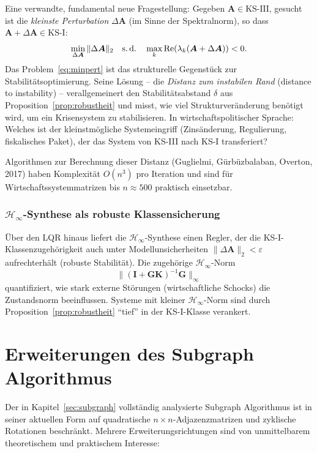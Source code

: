 ﻿\documentclass[12pt, a4paper, titlepage]{report}
\theoremstyle{definition}
\theoremstyle{remark}
\newcommand{\vA}{\bm{A}}
\newcommand{\vI}{\bm{I}}
\newcommand{\vK}{\bm{K}}
\newcommand{\vG}{\bm{G}}
\newcommand{\re}{\mathrm{Re}}
\newcommand{\KS}{\mathrm{KS}}
\begin{document}
Eine verwandte, fundamental neue Fragestellung: Gegeben $\vA \in \KS\text{-III}$,
gesucht ist die \emph{kleinste Perturbation} $\Delta\vA$ (im Sinne der Spektralnorm),
so dass $\vA + \Delta\vA \in \KS\text{-I}$:
\begin{equation}
  \min_{\Delta\vA} \|\Delta\vA\|_2 \quad \text{s.\,d.} \quad
  \max_k \re(\lambda_k(\vA + \Delta\vA)) < 0.
  \label{eq:minpert}
\end{equation}
Das Problem~\eqref{eq:minpert} ist das strukturelle Gegenstück zur
Stabilitätsoptimierung. Seine Lösung -- die \emph{Distanz zum instabilen Rand} (distance
to instability) -- verallgemeinert den Stabilitätsabstand $\delta$ aus
Proposition~\ref{prop:robustheit} und misst, wie viel Strukturveränderung benötigt wird,
um ein Krisensystem zu stabilisieren. In wirtschaftspolitischer Sprache: Welches ist
der kleinstmögli\-che System\-eingriff (Zinsänderung, Regulierung, fiskalisches Paket),
der das System von KS-III nach KS-I transferiert?

Algorithmen zur Berechnung dieser Distanz (Guglielmi, Gürbüzbalaban, Overton, 2017)
haben Komplexität $O(n^3)$ pro Iteration und sind für Wirtschaftssystemmatrizen
bis $n \approx 500$ praktisch einsetzbar.

\subsubsection*{$\mathcal{H}_\infty$-Synthese als robuste Klassensicherung}

Über den LQR hinaus liefert die $\mathcal{H}_\infty$-Synthese einen Regler, der
die KS-I-Klassenzugehörig\-keit auch unter Modellunsicherheiten $\|\Delta\vA\|_2 < \varepsilon$
aufrecht\-erhält (robuste Stabilität). Die zugehörige $\mathcal{H}_\infty$-Norm
\[
  \|(\vI + \vG\vK)^{-1}\vG\|_\infty
\]
quantifiziert, wie stark externe Störungen
(wirtschaftliche Schocks) die Zustandsnorm beeinflussen. Systeme mit kleiner
$\mathcal{H}_\infty$-Norm sind durch Proposition~\ref{prop:robustheit} ``tief''
in der KS-I-Klasse verankert.

\section{Erweiterungen des Subgraph Algorithmus}
\label{subsec:subgraph_erw}

Der in Kapitel~\ref{sec:subgraph} vollständig analysierte Subgraph Algorithmus
\citep{epp2026subgraph} ist in seiner aktuellen Form auf quadratische
$n \times n$-Adjazenzmatrizen und zyklische Rotationen beschränkt. Mehrere
Erweiterungsrichtungen sind von unmittelbarem theoretischem und praktischem Interesse:
\end{document}
